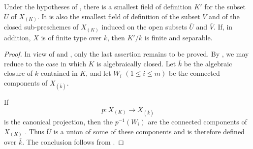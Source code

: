 \begin{corollary}[4.9.7]
\label{IV.4.9.7}
Under the hypotheses of , there is a smallest field
of definition $K'$ for the subset $\overline U$ of $X_{(K)}$.
It is also the smallest field of definition of the subset
$\overline V$ and of the closed sub-preschemes of $X_{(K)}$ induced
on the open subsets $\overline U$ and $\overline V$.
If, in addition, $X$ is of finite type over $k$, then $K'/k$ is
finite and separable.
\end{corollary}

\begin{proof}
In view of  and , only the last
assertion remains to be proved.
By , we may reduce to the case in which $K$ is
algebraically closed.
Let $\overline k$ be the algebraic closure of $k$ contained in $K$,
and let $W_i$ $(1\le i\le m)$ be the connected components of
$X_{(\overline k)}$.

If
\[
p:X_{(K)}\longrightarrow X_{(\overline k)}
\]
is the canonical projection, then the $p^{-1}(W_i)$ are the
connected components of $X_{(K)}$ .
Thus $\overline U$ is a union of some of these components and is
therefore defined over $\overline k$.
The conclusion follows from .
\end{proof}

